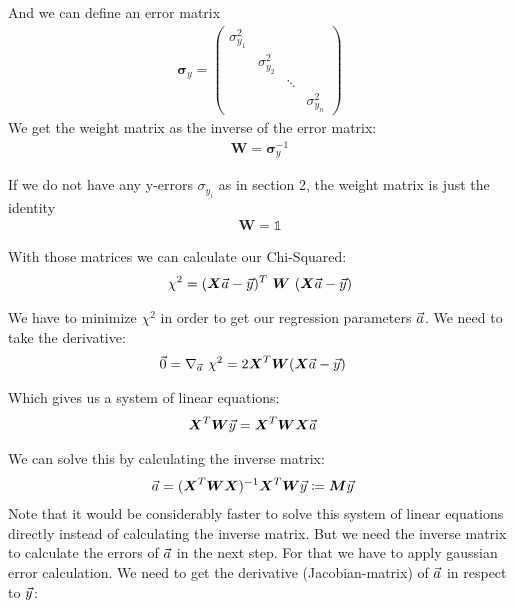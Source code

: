 \documentclass[11pt]{article}
\begin{document}
    And we can define an error matrix
    \newcommand{\eMatrix}{\boldsymbol{\sigma}_{y}}
    \newcommand{\eMatrixInv}{\boldsymbol{W}}
    \begin{align*}
        \eMatrix = \begin{pmatrix}
                       \sigma_{y_1}^2 \\
                       & \sigma_{y_2}^2\\
                       & & \ddots\\
                       & & & \sigma_{y_n}^2
        \end{pmatrix}
    \end{align*}
    We get the weight matrix as the inverse of the error matrix:
    \begin{align*}
        \eMatrixInv = \eMatrix^{-1}
    \end{align*}
    
    If we do not have any y-errors $\sigma_{y_i}$ as in section 2, the weight matrix is just the identity
    \begin{align*}
        \eMatrixInv = \mathds{1}
    \end{align*}
    
    With those matrices we can calculate our Chi-Squared:
    \begin{align*}
        \chi^2 = (\xMatrix \aVec - \yVec)^T \ \eMatrixInv \ (\xMatrix \aVec - \yVec)
    \end{align*}
    
    We have to minimize $\chi^2$ in order to get our regression parameters $\vec{a}$.
    We need to take the derivative:
    \begin{align*}
        \vec{0} &= \nabla_{\aVec} \ \chi^2 = 2 \xMatrixT \eMatrixInv (\xMatrix \aVec - \yVec)
    \end{align*}
    
    Which gives us a system of linear equations:
    \begin{align*}
        \xMatrixT \eMatrixInv \yVec &= \xMatrixT \eMatrixInv \xMatrix \aVec
    \end{align*}
    
    We can solve this by calculating the inverse matrix:
    \newcommand{\mMatrix}{\boldsymbol{M}}
    \begin{align*}
        \aVec &= (\xMatrixT \eMatrixInv \xMatrix)^{-1} \xMatrixT \eMatrixInv \yVec \coloneqq \mMatrix \yVec
    \end{align*}
    Note that it would be considerably faster to solve this system of linear equations directly instead of calculating
    the inverse matrix.
    But we need the inverse matrix to calculate the errors of $\vec{a}$ in the next step.
    For that we have to apply gaussian error calculation.
    We need to get the derivative (Jacobian-matrix) of $\vec{a}$ in respect to $\vec{y}$:
    
\end{document}
